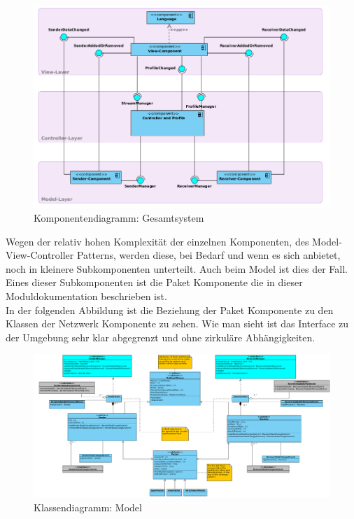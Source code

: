 \begin{figure}[H]
\includegraphics[width=15cm]{images/Overview.png}
\centering
\caption{Komponentendiagramm: Gesamtsystem}
\label{uml_controller}
\end{figure}

Wegen der relativ hohen Komplexität der einzelnen Komponenten, des Model-View-Controller Patterns, werden diese, bei Bedarf und wenn es sich anbietet, noch in kleinere Subkomponenten unterteilt. Auch beim Model ist dies der Fall. Eines dieser Subkomponenten ist die Paket Komponente die in dieser Moduldokumentation beschrieben ist.
\\
In der folgenden Abbildung ist die Beziehung der Paket Komponente zu den Klassen der Netzwerk Komponente zu sehen.
Wie man sieht ist das Interface zu der Umgebung sehr klar abgegrenzt und ohne zirkuläre Abhängigkeiten.

\begin{figure}[H]
\includegraphics[width=15cm]{images/Model.png}
\centering
\caption{Klassendiagramm: Model}
\label{uml_controller}
\end{figure}

